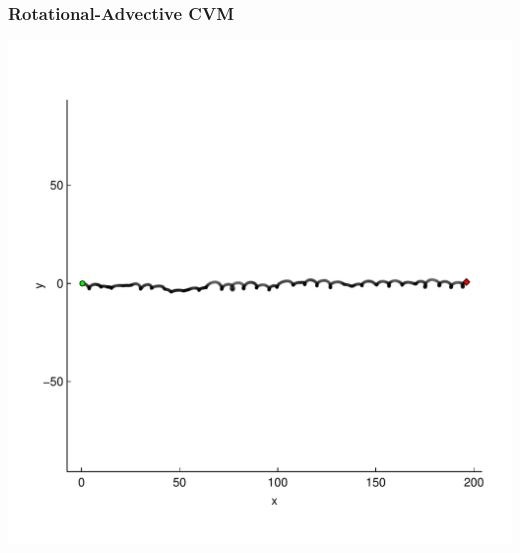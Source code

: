 \documentclass[10pt]{article}\usepackage[]{graphicx}\usepackage[]{color}
\makeatletter
\def\maxwidth{ %
  \ifdim\Gin@nat@width>\linewidth
    \linewidth
  \else
    \Gin@nat@width
  \fi
}
\newenvironment{knitrout}{}{} %
\makeatother
\begin{document}
\subsubsection{Rotational-Advective CVM}
     \begin{minipage}{0.4\linewidth}   
  \noindent
\begin{knitrout}
\color{fgcolor}
\includegraphics[width=\maxwidth]{figure/racvm-1} 

\end{knitrout}
   \end{minipage}
\end{document}
